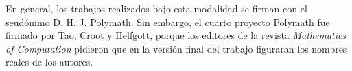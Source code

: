 En general, los trabajos realizados bajo esta modalidad se firman con el
seudónimo D. H. J. Polymath. Sin embargo, el cuarto proyecto Polymath fue
firmado por Tao, Croot y Helfgott, porque los editores de la revista
\emph{Mathematics of Computation} pidieron que en la versión final del trabajo
figuraran los nombres reales de los autores. 



